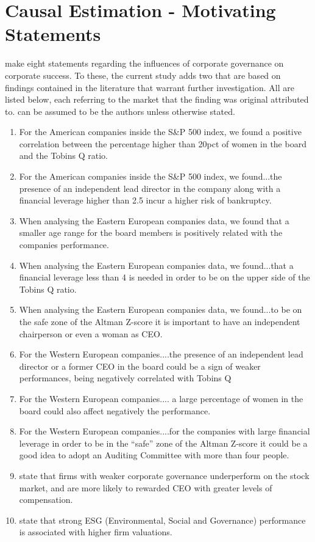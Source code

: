 {\section{Causal Estimation - Motivating Statements}\label{CausalEstimation-ResearchQuestions}
{\cite{moldovan2015learning} make eight statements regarding the influences of corporate governance on corporate success. To these, the current study adds two that are based on findings contained in the literature that warrant further investigation. All are listed below, each referring to the market that the finding was original attributed to. \cite{moldovan2015learning} can be assumed to be the authors unless otherwise stated.   }
\begin{enumerate}
  \item For the American companies inside the S\&P 500 index, we found a positive correlation between the percentage higher than 20pct of women in the board and the Tobins Q ratio. \label{spOne}
  \item For the American companies inside the S\&P 500 index, we found...the presence of an independent lead director in the company along with a financial leverage higher than 2.5 incur a higher risk of bankruptcy. \label{spTwo}
  \item When analysing the Eastern European companies data, we found that a smaller age range for the board members is positively related with the companies performance. \label{eastOne}
  \item When analysing the Eastern European companies data, we found...that a financial leverage less than 4 is needed in order to be on the upper side of the Tobins Q ratio. \label{eastTwo}
  \item When analysing the Eastern European companies data, we found...to be on the safe zone of the Altman Z-score it is important to have an independent chairperson or even a woman as CEO.  \label{eastThree}
  \item For the Western European companies....the presence of an independent lead director or a former CEO in the board could be a sign of weaker performances, being negatively correlated with Tobins Q  \label{westOne}
  \item For the Western European companies.... a large percentage of women in the board could also affect negatively the performance. \label{westTwo}
  \item For the Western European companies....for the companies with large financial leverage in order to be in the ``safe'' zone of the Altman Z-score it could be a good idea to adopt an Auditing Committee with more than four people. \label{westThree}
  \item  \cite{coreCompensation} state that firms with weaker corporate governance underperform on the stock market, and are more likely to rewarded CEO with greater levels of compensation. \label{wildOne}
  \item \cite{fatemiESG} state that strong ESG (Environmental, Social and Governance) performance is associated with higher firm valuations.\label{wildTwo}
\end{enumerate}
}
